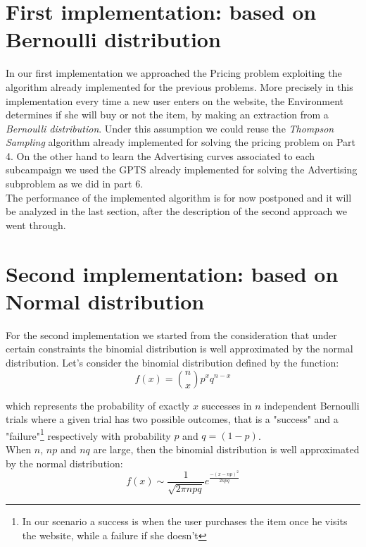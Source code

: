 \section{First implementation: based on Bernoulli distribution}
In our first implementation we approached the Pricing problem exploiting the algorithm already implemented for the previous problems. More precisely in this implementation every time a new user enters on the website, the Environment determines if she will buy or not the item, by making an extraction from a \textit{Bernoulli distribution}. Under this assumption we could reuse the \textit{Thompson Sampling} algorithm already implemented for solving the pricing problem on Part 4.
On the other hand to learn the Advertising curves associated to each subcampaign we used the GPTS already implemented for solving the Advertising subproblem as we did in part 6.\\ The performance of the implemented algorithm is for now postponed and it will be analyzed in the last section, after the description of the second approach we went through.


\section{Second implementation: based on Normal distribution}
For the second implementation we started from the consideration that under certain constraints the binomial distribution is well approximated by the normal distribution. Let's consider the binomial distribution defined by the function:
\begin{equation}
    f(x) = \binom{n}{x}  p^x q^{n-x}
\end{equation}

which represents the probability of exactly $x$ successes in $n$ independent Bernoulli trials where a given trial has two possible outcomes, that is a "success" and a "failure"\footnote{In our scenario a success is when the user purchases the item once he visits the website, while a failure if she doesn't} respectively with probability $p$ and $q=(1-p)$.\\ When $n$, $np$ and $nq$ are large, then the binomial distribution is well approximated by the normal distribution:
\begin{equation}
    f(x)  \sim \frac{1}{\sqrt{2 \pi npq}} e^{ \frac{-(x-np)^2}{2npq} }
\end{equation}

